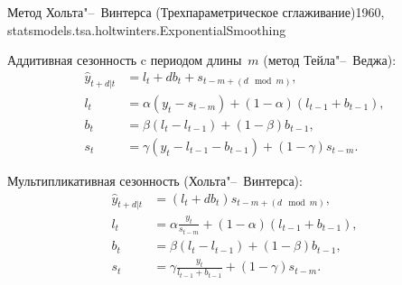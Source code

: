 \documentclass[10pt,pdf,utf8,hyperref={unicode},aspectratio=169]{beamer}
\begin{document}
\begin{frame}{Метод Хольта"--~Винтерса (Трехпараметрическое сглаживание)}{1960, statsmodels.tsa.holtwinters.ExponentialSmoothing}

	\begin{multicols}{2}
		Аддитивная сезонность c периодом длины~$m$ (метод Тейла"--~Веджа):
		\begin{align*}
		\hat{y}_{t+d|t} &= l_t + d b_t + s_{t-m+\left(d \mod m\right)}, \\
		l_{t}       	&=  \alpha \left(y_t - s_{t-m}\right)+ \left(1-\alpha\right) \left(l_{t-1} + b_{t-1}\right), \\
		b_t         	&= \beta \left(l_t - l_{t-1}\right) + \left(1-\beta\right)b_{t-1}, \\
		s_t         	&= \gamma\left(y_t-l_{t-1}-b_{t-1}\right) + \left(1-\gamma\right)s_{t-m}.
		\end{align*}
		
		\columnbreak
		
		Мультипликативная сезонность (Хольта"--~Винтерса):
		\begin{align*}
		\hat{y}_{t+d|t} &= \left(l_t + d b_t\right)s_{t-m+\left(d \mod m\right)}, \\
		l_{t}           &= \alpha \frac{y_t}{s_{t-m}}+ \left(1-\alpha\right) \left(l_{t-1} + b_{t-1}\right), \\
		b_t             &= \beta \left(l_t - l_{t-1}\right) + \left(1-\beta\right)b_{t-1}, \\
		s_t             &= \gamma\frac{y_t}{l_{t-1}+b_{t-1}} + \left(1-\gamma\right)s_{t-m}.
		\end{align*}

		
	\end{multicols}
\end{frame}
\end{document}
